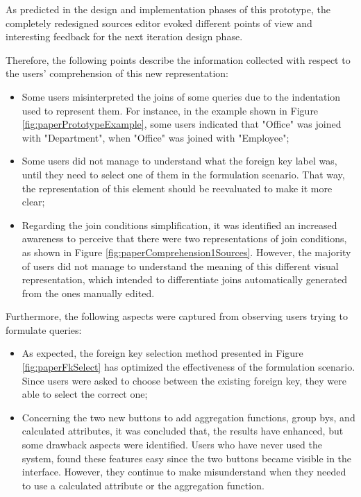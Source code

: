 As predicted in the design and implementation phases of this prototype, the completely redesigned sources editor evoked different points of view and interesting feedback for the next iteration design phase.

Therefore, the following points describe the information collected with respect to the users' comprehension of this new representation:

\begin{itemize}
  \item Some users misinterpreted the joins of some queries due to the indentation used to represent them. For instance, in the example shown in Figure \ref{fig:paperPrototypeExample}, some users indicated that "Office" was joined with "Department", when "Office" was joined with "Employee";
  \item Some users did not manage to understand what the foreign key label was, until they need to select one of them in the formulation scenario. That way, the representation of this element should be reevaluated to make it more clear;
  \item Regarding the join conditions simplification, it was identified an increased awareness to perceive that there were two representations of join conditions, as shown in Figure \ref{fig:paperComprehension1Sources}. However, the majority of users did not manage to understand the meaning of this different visual representation, which intended to differentiate joins automatically generated from the ones manually edited.
\end{itemize}

Furthermore, the following aspects were captured from observing users trying to formulate queries:

\begin{itemize}
  \item As expected, the foreign key selection method presented in Figure \ref{fig:paperFkSelect} has optimized the effectiveness of the formulation scenario. Since users were asked to choose between the existing foreign key, they were able to select the correct one;
  \item Concerning the two new buttons to add aggregation functions, group bys, and calculated attributes, it was concluded that, the results have enhanced, but some drawback aspects were identified. Users who have never used the system, found these features easy since the two buttons became visible in the interface. However, they continue to make misunderstand when they needed to use a calculated attribute or the aggregation function.
\end{itemize}

